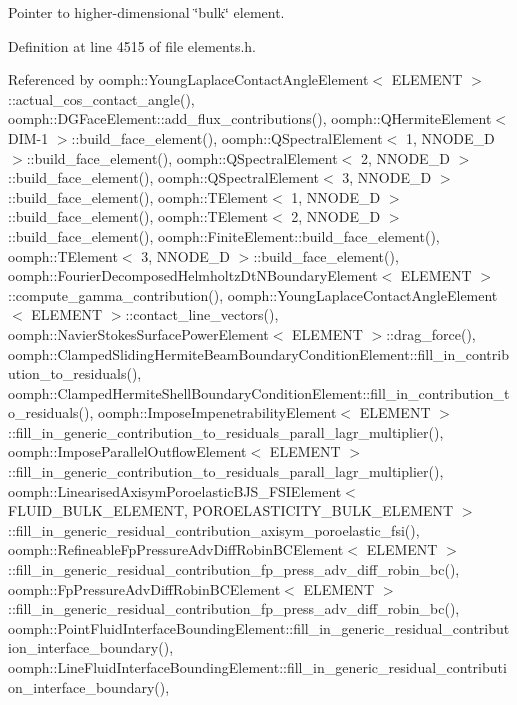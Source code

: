 Pointer to higher-\/dimensional \char`\"{}bulk\char`\"{} element. 



Definition at line 4515 of file elements.\+h.



Referenced by oomph\+::\+Young\+Laplace\+Contact\+Angle\+Element$<$ E\+L\+E\+M\+E\+N\+T $>$\+::actual\+\_\+cos\+\_\+contact\+\_\+angle(), oomph\+::\+D\+G\+Face\+Element\+::add\+\_\+flux\+\_\+contributions(), oomph\+::\+Q\+Hermite\+Element$<$ D\+I\+M-\/1 $>$\+::build\+\_\+face\+\_\+element(), oomph\+::\+Q\+Spectral\+Element$<$ 1, N\+N\+O\+D\+E\+\_\+D $>$\+::build\+\_\+face\+\_\+element(), oomph\+::\+Q\+Spectral\+Element$<$ 2, N\+N\+O\+D\+E\+\_\+D $>$\+::build\+\_\+face\+\_\+element(), oomph\+::\+Q\+Spectral\+Element$<$ 3, N\+N\+O\+D\+E\+\_\+D $>$\+::build\+\_\+face\+\_\+element(), oomph\+::\+T\+Element$<$ 1, N\+N\+O\+D\+E\+\_\+D $>$\+::build\+\_\+face\+\_\+element(), oomph\+::\+T\+Element$<$ 2, N\+N\+O\+D\+E\+\_\+D $>$\+::build\+\_\+face\+\_\+element(), oomph\+::\+Finite\+Element\+::build\+\_\+face\+\_\+element(), oomph\+::\+T\+Element$<$ 3, N\+N\+O\+D\+E\+\_\+D $>$\+::build\+\_\+face\+\_\+element(), oomph\+::\+Fourier\+Decomposed\+Helmholtz\+Dt\+N\+Boundary\+Element$<$ E\+L\+E\+M\+E\+N\+T $>$\+::compute\+\_\+gamma\+\_\+contribution(), oomph\+::\+Young\+Laplace\+Contact\+Angle\+Element$<$ E\+L\+E\+M\+E\+N\+T $>$\+::contact\+\_\+line\+\_\+vectors(), oomph\+::\+Navier\+Stokes\+Surface\+Power\+Element$<$ E\+L\+E\+M\+E\+N\+T $>$\+::drag\+\_\+force(), oomph\+::\+Clamped\+Sliding\+Hermite\+Beam\+Boundary\+Condition\+Element\+::fill\+\_\+in\+\_\+contribution\+\_\+to\+\_\+residuals(), oomph\+::\+Clamped\+Hermite\+Shell\+Boundary\+Condition\+Element\+::fill\+\_\+in\+\_\+contribution\+\_\+to\+\_\+residuals(), oomph\+::\+Impose\+Impenetrability\+Element$<$ E\+L\+E\+M\+E\+N\+T $>$\+::fill\+\_\+in\+\_\+generic\+\_\+contribution\+\_\+to\+\_\+residuals\+\_\+parall\+\_\+lagr\+\_\+multiplier(), oomph\+::\+Impose\+Parallel\+Outflow\+Element$<$ E\+L\+E\+M\+E\+N\+T $>$\+::fill\+\_\+in\+\_\+generic\+\_\+contribution\+\_\+to\+\_\+residuals\+\_\+parall\+\_\+lagr\+\_\+multiplier(), oomph\+::\+Linearised\+Axisym\+Poroelastic\+B\+J\+S\+\_\+\+F\+S\+I\+Element$<$ F\+L\+U\+I\+D\+\_\+\+B\+U\+L\+K\+\_\+\+E\+L\+E\+M\+E\+N\+T, P\+O\+R\+O\+E\+L\+A\+S\+T\+I\+C\+I\+T\+Y\+\_\+\+B\+U\+L\+K\+\_\+\+E\+L\+E\+M\+E\+N\+T $>$\+::fill\+\_\+in\+\_\+generic\+\_\+residual\+\_\+contribution\+\_\+axisym\+\_\+poroelastic\+\_\+fsi(), oomph\+::\+Refineable\+Fp\+Pressure\+Adv\+Diff\+Robin\+B\+C\+Element$<$ E\+L\+E\+M\+E\+N\+T $>$\+::fill\+\_\+in\+\_\+generic\+\_\+residual\+\_\+contribution\+\_\+fp\+\_\+press\+\_\+adv\+\_\+diff\+\_\+robin\+\_\+bc(), oomph\+::\+Fp\+Pressure\+Adv\+Diff\+Robin\+B\+C\+Element$<$ E\+L\+E\+M\+E\+N\+T $>$\+::fill\+\_\+in\+\_\+generic\+\_\+residual\+\_\+contribution\+\_\+fp\+\_\+press\+\_\+adv\+\_\+diff\+\_\+robin\+\_\+bc(), oomph\+::\+Point\+Fluid\+Interface\+Bounding\+Element\+::fill\+\_\+in\+\_\+generic\+\_\+residual\+\_\+contribution\+\_\+interface\+\_\+boundary(), oomph\+::\+Line\+Fluid\+Interface\+Bounding\+Element\+::fill\+\_\+in\+\_\+generic\+\_\+residual\+\_\+contribution\+\_\+interface\+\_\+boundary(), 